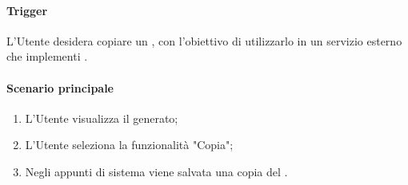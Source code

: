 \paragraph*{Trigger}
L'Utente desidera copiare un , con l'obiettivo di utilizzarlo in un servizio esterno che implementi .

\paragraph*{Scenario principale}
\begin{enumerate}
  \item L'Utente visualizza il  generato;
  \item L'Utente seleziona la funzionalità "Copia";
  \item Negli appunti di sistema viene salvata una copia del .
\end{enumerate}